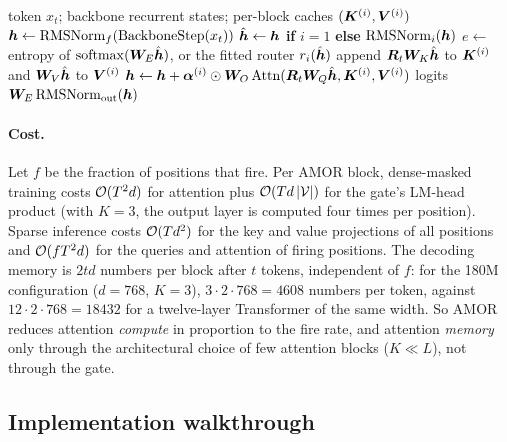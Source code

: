 \begin{algorithm}[t]
\caption{AMOR decoding step at position $t$}
\label{alg:c13-amor-decode}
\begin{algorithmic}[1]
\Require token $x_t$; backbone recurrent states; per-block caches $(\bm{K}^{(i)},\bm{V}^{(i)})$
\State $\bm{h}\gets\operatorname{RMSNorm}_f(\text{BackboneStep}(x_t))$ 
  \State $\hat{\bm{h}}\gets\bm{h}$ \textbf{if} $i=1$ \textbf{else} $\operatorname{RMSNorm}_i(\bm{h})$
  \State $e\gets$ entropy of $\operatorname{softmax}(\bm{W}_E\hat{\bm{h}})$, or the fitted router $r_i(\hat{\bm{h}})$
  \State append $\bm{R}_t\bm{W}_K\hat{\bm{h}}$ to $\bm{K}^{(i)}$ and $\bm{W}_V\hat{\bm{h}}$ to $\bm{V}^{(i)}$ 
    \State $\bm{h}\gets\bm{h}+\bm{\alpha}^{(i)}\odot\bm{W}_O\,\mathrm{Attn}(\bm{R}_t\bm{W}_Q\hat{\bm{h}},\bm{K}^{(i)},\bm{V}^{(i)})$
  \EndIf
\EndFor
\State \Return logits $\bm{W}_E\operatorname{RMSNorm}_{\text{out}}(\bm{h})$
\end{algorithmic}
\end{algorithm}

\paragraph{Cost.} Let $f$ be the fraction of positions that fire. Per AMOR block, dense-masked training
costs $\mathcal{O}(T^2d)$ for attention plus $\mathcal{O}(Td\left\lvert \mathcal{V}\right\rvert)$ for the gate's LM-head product (with
$K=3$, the output layer is computed four times per position). Sparse inference costs $\mathcal{O}(Td^2)$ for the
key and value projections of all positions and $\mathcal{O}(fT^2d)$ for the queries and attention of firing
positions. The decoding memory is $2td$ numbers per block after $t$ tokens, independent of $f$: for the 180M
configuration ($d=768$, $K=3$), $3\cdot2\cdot768=4608$ numbers per token, against $12\cdot2\cdot768=18432$ for
a twelve-layer Transformer of the same width. So AMOR reduces attention \emph{compute} in proportion to
the fire rate, and attention \emph{memory} only through the architectural choice of few attention blocks
($K\ll L$), not through the gate.

\subsection{Implementation walkthrough}\label{sec:c13-amor-impl}


